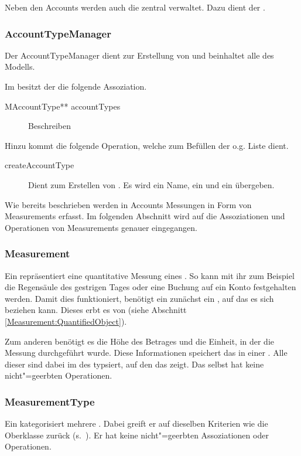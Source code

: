 Neben den Accounts werden auch die  zentral verwaltet. Dazu dient der .


\subsubsection{AccountTypeManager}
Der AccountTypeManager dient zur Erstellung von  und beinhaltet alle  des Modells.

Im \MM besitzt der  die folgende Assoziation.
\begin{description}
	\item[MAccountType** accountTypes] Beschreiben
\end{description}

Hinzu kommt die folgende Operation, welche zum Befüllen der o.g. Liste dient.
\begin{description}
	\item[createAccountType] Dient zum Erstellen von . 
	Es wird ein Name, ein  und ein  übergeben.
\end{description}

Wie bereits beschrieben werden in Accounts Messungen in Form von Measurements erfasst. 
Im folgenden Abschnitt wird auf die Assoziationen und Operationen von Measurements genauer eingegangen.


\subsubsection{Measurement}
Ein  repräsentiert eine quantitative Messung eines . So kann mit ihr zum Beispiel die Regensäule des gestrigen Tages
oder eine Buchung auf ein Konto festgehalten werden. Damit dies funktioniert, benötigt ein  zunächst ein , auf das es
sich beziehen kann. Dieses erbt es von  (siehe Abschnitt \ref{Measurement:QuantifiedObject}).

Zum anderen benötigt es die Höhe des Betrages und die Einheit, in der die Messung durchgeführt wurde. Diese Informationen speichert das 
in einer . Alle  dieser  sind dabei im  des  typsiert,
auf den das  zeigt. Das  selbst hat keine nicht"=geerbten Operationen.


\subsubsection{MeasurementType}
Ein  kategorisiert mehrere . Dabei greift er auf dieselben Kriterien wie die Oberklasse 
zurück (s.~). Er hat keine nicht"=geerbten Assoziationen oder Operationen.


